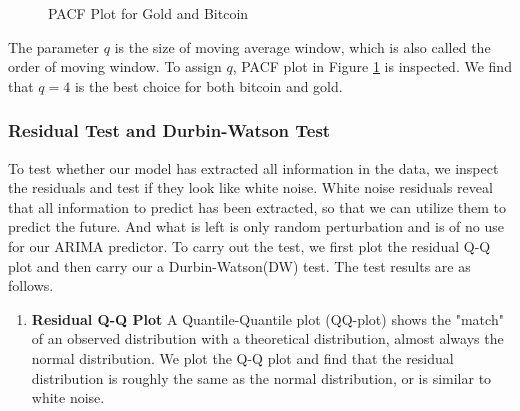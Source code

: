 \documentclass[12pt,a4paper]{article}
\newcommand{\Predictor}{ARIMA }
\begin{document}
\begin{spacing}{1.2}
\begin{figure}
	\begin{center}
		\label{fig:pacf}
		\caption{PACF Plot for Gold and Bitcoin}
	\end{center}
\end{figure}

The parameter $q$ is the size of moving average window, which is also called the order of moving window. To assign $q$, PACF plot in Figure \ref{fig:pacf} is inspected. We find that $q=4$ is the best choice for both bitcoin and gold.


\subsubsection{Residual Test and Durbin-Watson Test}
To test whether our model has extracted all information in the data, we inspect the residuals and test if they look like white noise. White noise residuals reveal that all information to predict has been extracted, so that we can utilize them to predict the future. And what is left is only random perturbation and is of no use for our \Predictor predictor. To carry out the test, we first plot the residual Q-Q plot and then carry our a Durbin-Watson(DW) test. The test results are as follows.

\begin{enumerate}
	\item \textbf{Residual Q-Q Plot}
	A Quantile-Quantile plot (QQ-plot) shows the "match" of an observed distribution with a theoretical distribution, almost always the normal distribution. We plot the Q-Q plot and find that the residual distribution is roughly the same as the normal distribution, or is similar to white noise.
	

\end{enumerate}
\end{spacing}
\end{document}
